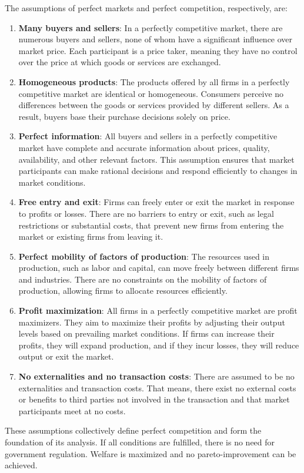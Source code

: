 The assumptions of perfect markets and perfect competition, respectively, are: 
\begin{enumerate}
	\item  \textbf{Many buyers and sellers}: In a perfectly competitive market, there are numerous buyers and sellers, none of whom have a significant influence over market price. Each participant is a price taker, meaning they have no control over the price at which goods or services are exchanged.
	
	\item  \textbf{Homogeneous products}: The products offered by all firms in a perfectly competitive market are identical or homogeneous. Consumers perceive no differences between the goods or services provided by different sellers. As a result, buyers base their purchase decisions solely on price.
	
	\item  \textbf{Perfect information}: All buyers and sellers in a perfectly competitive market have complete and accurate information about prices, quality, availability, and other relevant factors. This assumption ensures that market participants can make rational decisions and respond efficiently to changes in market conditions. 
	\item  \textbf{Free entry and exit}: Firms can freely enter or exit the market in response to profits or losses. There are no barriers to entry or exit, such as legal restrictions or substantial costs, that prevent new firms from entering the market or existing firms from leaving it.
	
	\item  \textbf{Perfect mobility of factors of production}: The resources used in production, such as labor and capital, can move freely between different firms and industries. There are no constraints on the mobility of factors of production, allowing firms to allocate resources efficiently.
	
	\item  \textbf{Profit maximization}: All firms in a perfectly competitive market are profit maximizers. They aim to maximize their profits by adjusting their output levels based on prevailing market conditions. If firms can increase their profits, they will expand production, and if they incur losses, they will reduce output or exit the market.
	
	\item  \textbf{No externalities and no transaction costs}: There are assumed to be no externalities and transaction costs. That means, there exist no external costs or benefits to third parties not involved in the transaction and that market participants meet at no costs. 
	
\end{enumerate}
These assumptions collectively define perfect competition and form the foundation of its analysis. If all conditions are fulfilled, there is no need for government regulation. Welfare is maximized and no pareto-improvement can be achieved.


